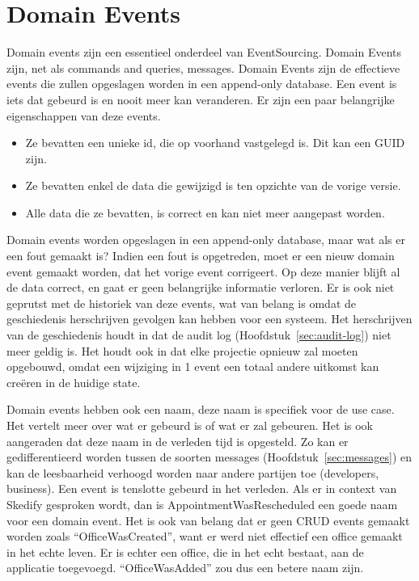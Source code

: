 
\section{Domain Events}
\label{sec:domain-events}

Domain events zijn een essentieel onderdeel van EventSourcing. Domain Events zijn, net als commands and queries, messages. Domain Events zijn de effectieve events die zullen opgeslagen worden in een append-only database. Een event is iets dat gebeurd is en nooit meer kan veranderen. Er zijn een paar belangrijke eigenschappen van deze events.

\begin{itemize}
  \item{Ze bevatten een unieke id, die op voorhand vastgelegd is. Dit kan een \gls{GUID} zijn.}
  \item{Ze bevatten enkel de data die gewijzigd is ten opzichte van de vorige versie.}
  \item{Alle data die ze bevatten, is correct en kan niet meer aangepast worden.}
\end{itemize}

Domain events worden opgeslagen in een append-only database, maar wat als er een fout gemaakt is? Indien een fout is opgetreden, moet er een nieuw domain event gemaakt worden, dat het vorige event corrigeert. Op deze manier blijft al de data correct, en gaat er geen belangrijke informatie verloren. Er is ook niet geprutst met de historiek van deze events, wat van belang is omdat de geschiedenis herschrijven gevolgen kan hebben voor een systeem. Het herschrijven van de geschiedenis houdt in dat de audit log (Hoofdstuk~\ref{sec:audit-log}) niet meer geldig is. Het houdt ook in dat elke projectie opnieuw zal moeten opgebouwd, omdat een wijziging in 1 event een totaal andere uitkomst kan creëren in de huidige state.

Domain events hebben ook een naam, deze naam is specifiek voor de use case. Het vertelt meer over wat er gebeurd is of wat er zal gebeuren. Het is ook aangeraden dat deze naam in de verleden tijd is opgesteld. Zo kan er gedifferentieerd worden tussen de soorten messages (Hoofdstuk~\ref{sec:messages}) en kan de leesbaarheid verhoogd worden naar andere partijen toe (developers, business). Een event is tenslotte gebeurd in het verleden. Als er in context van Skedify gesproken wordt, dan is AppointmentWasRescheduled een goede naam voor een domain event. Het is ook van belang dat er geen \gls{CRUD} events gemaakt worden zoals ``OfficeWasCreated'', want er werd niet effectief een office gemaakt in het echte leven. Er is echter een office, die in het echt bestaat, aan de applicatie toegevoegd. ``OfficeWasAdded'' zou dus een betere naam zijn.
